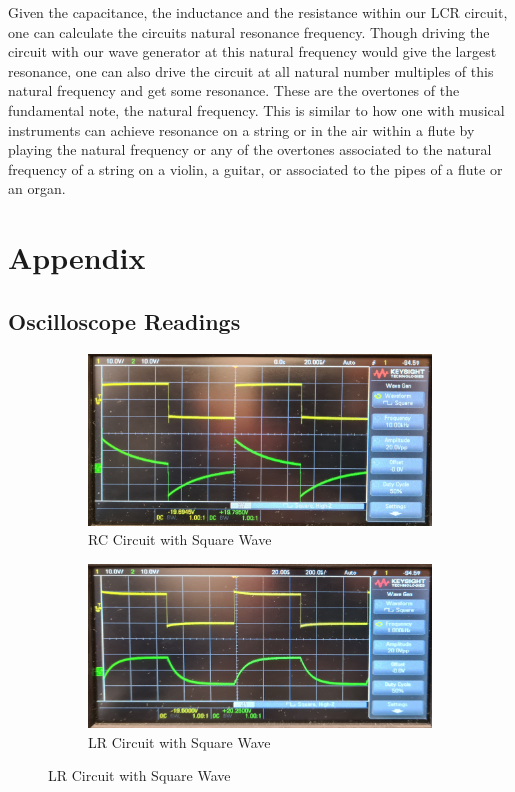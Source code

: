 \documentclass[a4paper,12pt]{article}
\begin{document}
Given the capacitance, the inductance and the resistance within our LCR circuit, one can calculate the circuits natural resonance frequency.
Though driving the circuit with our wave generator at this natural frequency would give the largest resonance, one can also drive the circuit at all 
natural number multiples of this natural frequency and get some resonance. These are the overtones of the fundamental note, the natural frequency. 
This is similar to how one with musical instruments can achieve resonance on a string or in the air within a flute by playing the natural frequency or any 
of the overtones associated to the natural frequency of a string on a violin, a guitar, or associated to the pipes of a flute or an organ.


\pagebreak

\appendix

\section{Appendix}

\subsection{Oscilloscope Readings}

\begin{figure}[H]
  \centering
  \begin{subfigure}{.5\textwidth}
    \centering
    \includegraphics[width=.9\linewidth]{../data/20211116_104029-mod.jpg}
    \caption{RC Circuit with Square Wave}
  \end{subfigure}%
  \begin{subfigure}{.5\textwidth}
    \centering
    \includegraphics[width=.9\linewidth]{../data/20211116_104711-mod.jpg}
    \caption{LR Circuit with Square Wave}
  \end{subfigure}
\end{figure}
\end{document}
